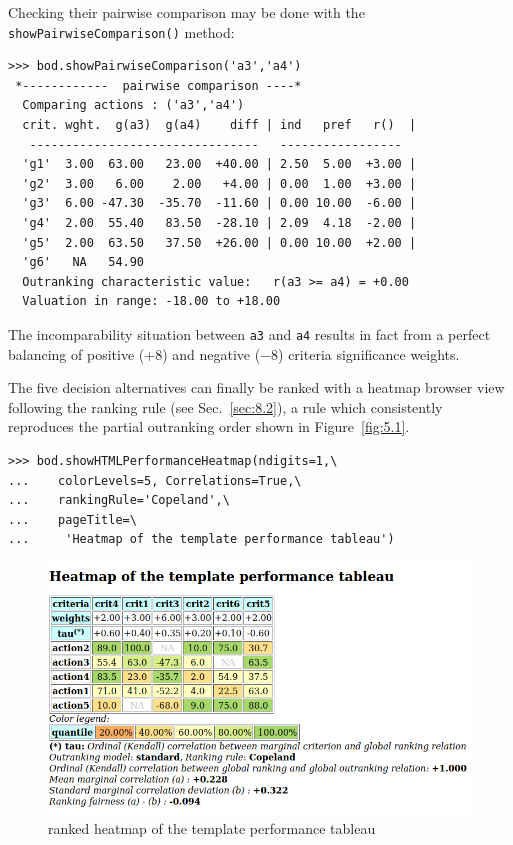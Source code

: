 Checking their pairwise comparison may be done with the \texttt{showPairwiseCompari\-son()} method:
\begin{lstlisting}
>>> bod.showPairwiseComparison('a3','a4')
 *------------  pairwise comparison ----*
  Comparing actions : ('a3','a4')
  crit. wght.  g(a3)  g(a4)    diff | ind   pref   r()  | 
   --------------------------------   -----------------
  'g1'  3.00  63.00   23.00  +40.00 | 2.50  5.00  +3.00 | 
  'g2'  3.00   6.00    2.00   +4.00 | 0.00  1.00  +3.00 | 
  'g3'  6.00 -47.30  -35.70  -11.60 | 0.00 10.00  -6.00 | 
  'g4'  2.00  55.40   83.50  -28.10 | 2.09  4.18  -2.00 | 
  'g5'  2.00  63.50   37.50  +26.00 | 0.00 10.00  +2.00 | 
  'g6'   NA   54.90
  Outranking characteristic value:   r(a3 >= a4) = +0.00
  Valuation in range: -18.00 to +18.00
\end{lstlisting}

The incomparability situation between \texttt{a3} and \texttt{a4} results in fact from a perfect balancing of positive ($+8$) and negative ($-8$) criteria significance weights.

The five decision alternatives can finally be ranked with a heatmap browser view following the \Copeland ranking rule (see Sec.~\ref{sec:8.2}), a rule which consistently reproduces the partial outranking order shown in Figure~\vref{fig:5.1}. 
\begin{lstlisting}
>>> bod.showHTMLPerformanceHeatmap(ndigits=1,\
...    colorLevels=5, Correlations=True,\
...    rankingRule='Copeland',\
...    pageTitle=\
...     'Heatmap of the template performance tableau')
\end{lstlisting}
\begin{figure}[ht]
\includegraphics[width=\hsize]{Figures/5-2-templateHeatmapCop.png}
\caption{\Copeland ranked heatmap of the template performance tableau}
\label{fig:5.2}       %
\end{figure}

